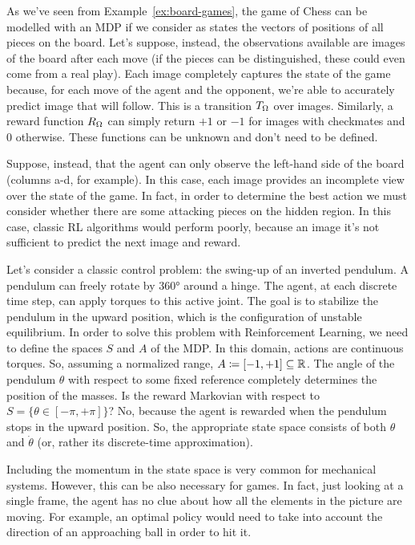 \begin{example}
	As we've seen from Example~\vref{ex:board-games}, the game of Chess can
	be modelled with an MDP if we consider as states the vectors of positions of
	all pieces on the board. Let's suppose, instead, the observations available
	are images of the board after each move (if the pieces can be distinguished,
	these could even come from a real play). Each image completely captures the
	state of the game because, for each move of the agent and the opponent,
	we're able to accurately predict image that will follow. This is a
	transition $T_\Omega$ over images. Similarly, a reward function $R_\Omega$ can
	simply return $+1$ or $-1$ for images with checkmates and 0 otherwise. These
	functions can be unknown and don't need to be defined.

	Suppose, instead, that the agent can only observe the left-hand side of the
	board (columns a-d, for example). In this case, each image provides an
	incomplete view over the state of the game. In fact, in order to determine
	the best action we must consider whether there are some attacking pieces on
	the hidden region. In this case, classic RL algorithms would perform poorly,
	because an image it's not sufficient to predict the next image and reward.
\end{example}

\begin{example}
	Let's consider a classic control problem: the swing-up of an inverted
	pendulum. A pendulum can freely rotate by 360° around a hinge. The agent, at
	each discrete time step, can apply torques to this active joint.  The goal
	is to stabilize the pendulum in the upward position, which is the
	configuration of unstable equilibrium. In order to solve this problem with
	Reinforcement Learning, we need to define the spaces $S$ and $A$ of the MDP.
	In this domain, actions are continuous torques. So, assuming a normalized
	range, $A \coloneqq [-1, +1] \subseteq \mathbb{R}$. The angle of the pendulum
	$\theta$ with respect to some fixed reference completely determines the
	position of the masses. Is the reward Markovian with respect to $S =
	\{\theta \in [-\pi, +\pi]\}$? No, because the agent is rewarded when the
	pendulum stops in the upward position. So, the appropriate state space
	consists of both $\theta$ and $\dot\theta$ (or, rather its discrete-time
	approximation).

	Including the momentum in the state space is very common for mechanical
	systems. However, this can be also necessary for games. In fact, just
	looking at a single frame, the agent has no clue about how all the elements
	in the picture are moving.  For example, an optimal policy would need to
	take into account the direction of an approaching ball in order to hit it.
	\label{ex:motion}
\end{example}


